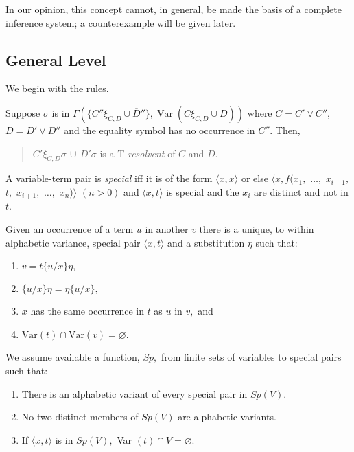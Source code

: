 \documentclass[letterpaper]{report}
\begin{document}
In our opinion, this concept cannot, in general, be made the basis of a
complete inference system; a counterexample will be given later.

\subsection*{General Level}\label{general-level}

We begin with the rules.

Suppose $\sigma$ is in
$\Gamma(\{C''\xi_{C,D}\cup\overline{D}''\}, \operatorname{Var}
(C\xi_{C,D}\cup D))$ where $C=C'\vee C''$,
$D=D'\lor D''$ and the equality symbol has no
occurrence in $C''$. Then,
\begin{quote}
$C'\xi_{C,D}\sigma\,\cup\,D'\sigma$ is a
$\mathrm{T}$-\emph{resolvent} of $C$ and $D$.
\end{quote}

A variable-term pair is \emph{special} iff it is of the form
$\langle x,x\rangle$ or else
$\langle x, f(x_{1},$ $\ldots,$ $x_{i-1},$ $t,$ $x_{i+1},$ $\ldots,$ $x_{n})\rangle$ $(n>0)$
and $\langle x, t\rangle$ is special and the $x_{i}$ are distinct
and not in $t$.

Given an occurrence of a term $u$ in another $v$ there is a unique,
to within alphabetic variance, special pair $\langle x,$$t\rangle$
and a substitution $\eta$ such that:

\begin{enumerate}
	\def\labelenumi{(\arabic{enumi})}
	\item
	$v=t\{u/x\}\eta,$
	\item
	$\{u/x\}\eta=\eta\{u/x\},$
	\item
	$x$ has the same occurrence in $t$ as $u$ in $v,$ and
	\item
	$\mbox{Var}(t)\cap\mbox{Var}(v)=\varnothing$.
\end{enumerate}

We assume available a function, $Sp,$ from finite sets of variables to
special pairs such that:

\begin{enumerate}
	\def\labelenumi{(\arabic{enumi})}
	\item
	There is an alphabetic variant of every special pair in $Sp(V).$
	\item
	No two distinct members of $Sp(V)$ are alphabetic variants.
	\item
	If $\langle x,$$t\rangle$ is in $Sp(V),$ Var
	$(t)\cap V=\varnothing$.
\end{enumerate}
\end{document}
